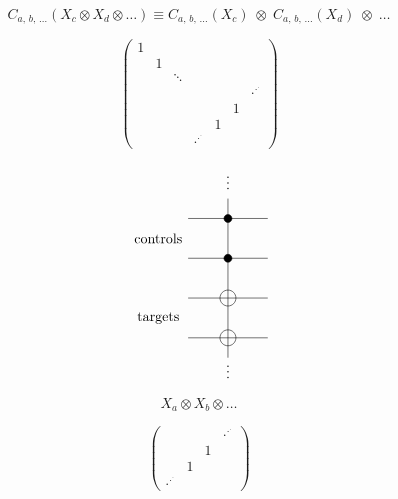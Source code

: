 \documentclass{article}
\begin{document}
\[
    C_{a, \,b, \,\dots}( X_c \otimes X_d \otimes \dots ) \equiv
    C_{a, \,b, \,\dots}( X_c) \; \otimes \; C_{a, \,b, \,\dots}(X_d) \; \otimes \; \dots
\]
\pagebreak

\[
\begin{pmatrix}
1 \\
& 1 \\\
& & \ddots \\
& & & &   &    & {{\scriptstyle\cdot}^{{\scriptstyle\cdot}^{{\scriptstyle\cdot}}}} \\
& & & &   & 1  &   \\
& & & & 1 &    &  \\
& & & {{\scriptstyle\cdot}^{{\scriptstyle\cdot}^{{\scriptstyle\cdot}}}} & & &
\end{pmatrix}
\]
\pagebreak

\[
             \begin{tikzpicture}[scale=.5]
             \node[draw=none] at (-3.5, 1) {targets};
             \node[draw=none] at (-3.5, 5) {controls};
             
             \node[draw=none] at (0, 8) {$\vdots$};
             \draw (0, 7) -- (0, 6);
             
             \draw (-2, 6) -- (2, 6);
             \draw[fill=black] (0, 6) circle (.2);
             \draw (0, 6) -- (0, 4);         
             
             \draw (-2, 4) -- (2, 4);
             \draw[fill=black] (0, 4) circle (.2);
             \draw(0, 4) -- (0, -1);
             
             \draw (-2,2) -- (2, 2);
             \draw (0, 2) circle (.4);

             \draw (-2,0) -- (2, 0);
             \draw (0, 0) circle (.4);
             
             \node[draw=none] at (0, -1.5) {$\vdots$};
             \end{tikzpicture}
 \]
\pagebreak

\[
    X_a \otimes X_b \otimes \dots 
\]
\pagebreak

\[
\begin{pmatrix}
 &   &    & {{\scriptstyle\cdot}^{{\scriptstyle\cdot}^{{\scriptstyle\cdot}}}} \\
 &   & 1  &   \\
 & 1 &    &  \\
 {{\scriptstyle\cdot}^{{\scriptstyle\cdot}^{{\scriptstyle\cdot}}}} & & &
\end{pmatrix}
\]
\pagebreak
\end{document}

